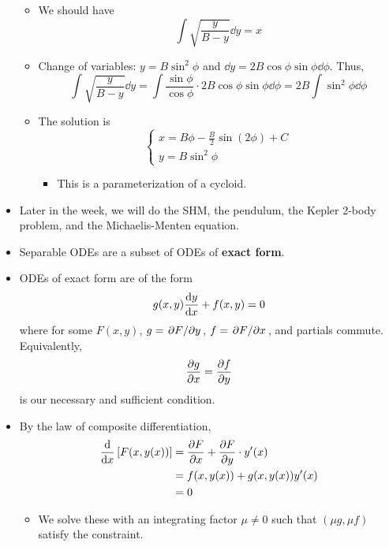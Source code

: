 \documentclass[../notes.tex]{subfiles}
\begin{document}
\begin{itemize}
\begin{itemize}
\begin{itemize}
        \end{itemize}
        \item We should have
        \begin{equation*}
            \int\sqrt{\frac{y}{B-y}}\dd{y} = x
        \end{equation*}
        \item Change of variables: $y=B\sin^2\phi$ and $\dd{y}=2B\cos\phi\sin\phi\dd{\phi}$. Thus,
        \begin{equation*}
            \int\sqrt{\frac{y}{B-y}}\dd{y} = \int\frac{\sin\phi}{\cos\phi}\cdot 2B\cos\phi\sin\phi\dd{\phi}
            = 2B\int\sin^2\phi\dd{\phi}
        \end{equation*}
        \item The solution is
        \begin{equation*}
            \begin{cases}
                x = B\phi-\frac{B}{2}\sin(2\phi)+C\\
                y = B\sin^2\phi
            \end{cases}
        \end{equation*}
        \begin{itemize}
            \item This is a parameterization of a cycloid.
        \end{itemize}
    \end{itemize}
    \item Later in the week, we will do the SHM, the pendulum, the Kepler 2-body problem, and the Michaelis-Menten equation.
    \item Separable ODEs are a subset of ODEs of \textbf{exact form}.
    \item ODEs of exact form are of the form
    \begin{equation*}
        g(x,y)\dv{y}{x}+f(x,y) = 0
    \end{equation*}
    where for some $F(x,y)$, $g=\pdv*{F}{y}$, $f=\pdv*{F}{x}$, and partials commute. Equivalently,
    \begin{equation*}
        \pdv{g}{x} = \pdv{f}{y}
    \end{equation*}
    is our necessary and sufficient condition.
    \item By the law of composite differentiation,
    \begin{align*}
        \dv{x}\left[ F(x,y(x)) \right] &= \pdv{F}{x}(x,y(x))+\pdv{F}{y}(x,y(x))\cdot y'(x)\\
        &= f(x,y(x))+g(x,y(x))y'(x)\\
        &= 0
    \end{align*}
    \begin{itemize}
        \item We solve these with an integrating factor $\mu\neq 0$ such that $(\mu g,\mu f)$ satisfy the constraint.
    \end{itemize}
\end{itemize}
\end{document}
